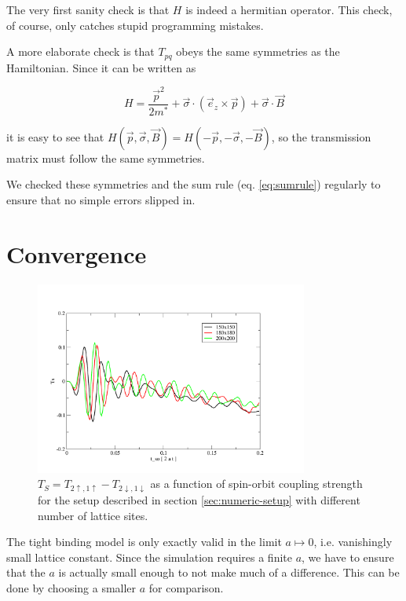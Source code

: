 The very first sanity check is that $H$ is indeed a hermitian
operator. This check, of course, only catches stupid programming
mistakes.

A more elaborate check is that $T_{pq}$ obeys the same symmetries as
the Hamiltonian. Since it can be written as
  
\begin{equation}
H = \frac{\vec{p}^2}{2 m^*} + \vec \sigma \cdot (\vec e_z \times \vec p)  
    + \vec \sigma \cdot \vec B
\end{equation}

it is easy to see that $H(\vec p, \vec \sigma, \vec B) = H(-\vec p,
-\vec \sigma, -\vec B)$, so the transmission matrix must follow the
same symmetries.

We checked these symmetries and the sum rule (eq. \ref{eq:sumrule}) regularly
to ensure that no simple errors slipped in.

\section{Convergence}
\begin{figure}[htb]
    \begin{center}
        \includegraphics[width=0.8\textwidth]{convergence.pdf}
    \end{center}
    \caption{$T_S = T_{2\uparrow,1\uparrow}-T_{2\downarrow,1\downarrow}$ as a
        function of spin-orbit coupling strength for the setup described in
        section \ref{sec:numeric-setup} with different number of lattice
        sites.}
    \label{fig:convergence}
\end{figure}

The tight binding model is only exactly valid in the limit $ a \mapsto 0$,
i.e. vanishingly small lattice constant. Since the simulation requires a finite
$a$, we have to ensure that the $a$ is actually small enough to not make much
of a difference. This can be done by choosing a smaller $a$ for comparison.

